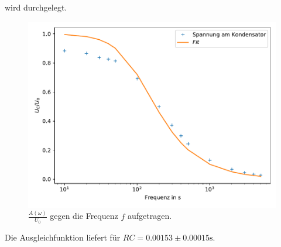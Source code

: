     \noindent
    wird durchgelegt.
    \begin{figure}
        \centering
        \includegraphics[width=\textwidth]{Daten/b.pdf}
        \caption{$\frac{A(\omega)}{U_0}$ gegen die Frequenz $f$ aufgetragen.}
    \end{figure}

    \noindent
    Die Ausgleichfunktion liefert für $RC = 0.00153 \pm 0.00015 \si{\second}$.
\newpage
